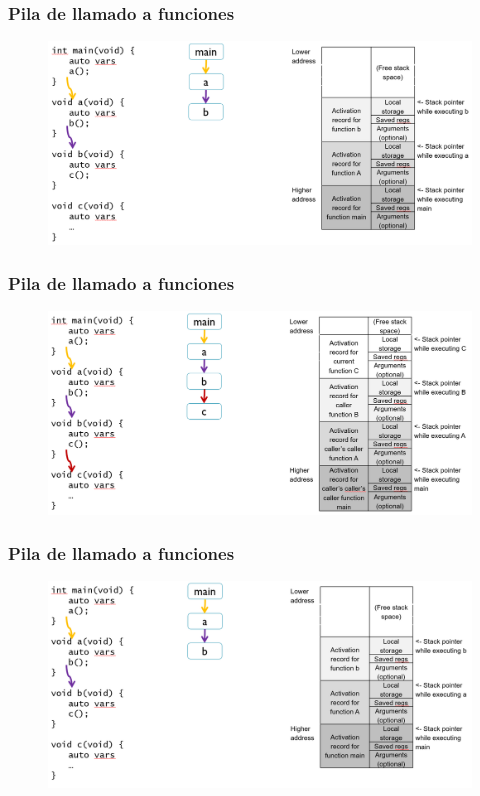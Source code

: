 \documentclass[10.5pt,scale=1.0,t,aspectratio=169,hyperref={pdfpagelabels=false}]{beamer}
\begin{document}
\begin{frame}
	\frametitle{Pila de llamado a funciones}
	\begin{figure}
		\centering
		\includegraphics[scale=0.4]{StackFunction3}
	\end{figure}
\end{frame}
\begin{frame}
	\frametitle{Pila de llamado a funciones}
	\begin{figure}
		\centering
		\includegraphics[scale=0.4]{StackFunction4}
	\end{figure}
\end{frame}
\begin{frame}
	\frametitle{Pila de llamado a funciones}
	\begin{figure}
		\centering
		\includegraphics[scale=0.4]{StackFunction5}
	\end{figure}
\end{frame}
\end{document}
